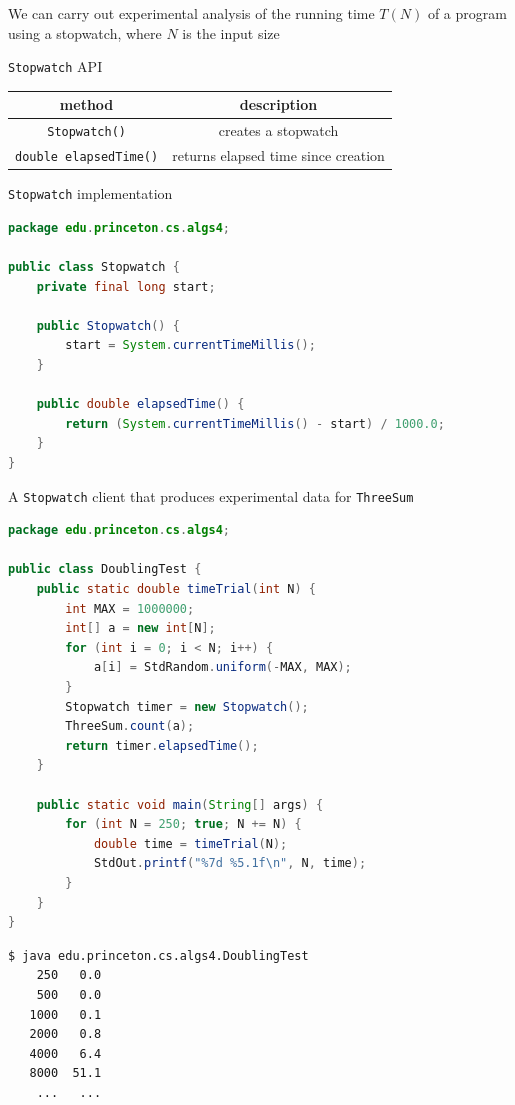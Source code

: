 \documentclass[8pt,a4paper,compress]{beamer}
\begin{document}
\begin{frame}[fragile]
We can carry out experimental analysis of the running time $T(N)$ of a program using a stopwatch, where $N$ is the input size

\bigskip

\lstinline{Stopwatch} API
\begin{center}
\begin{tabular}{cc}
method & description \\ \hline
\lstinline$Stopwatch()$ & creates a stopwatch \\
\lstinline$double elapsedTime()$ & returns elapsed time since creation
\end{tabular} 
\end{center}

\bigskip

\lstinline{Stopwatch} implementation
\begin{lstlisting}[language=Java]
package edu.princeton.cs.algs4;

public class Stopwatch {
    private final long start;
    
    public Stopwatch() { 
        start = System.currentTimeMillis(); 
    }
    
    public double elapsedTime() {
        return (System.currentTimeMillis() - start) / 1000.0;
    }
}
\end{lstlisting}
\end{frame}

\begin{frame}[fragile]
A \lstinline{Stopwatch} client that produces experimental data for \lstinline{ThreeSum}
\begin{lstlisting}[language=Java]
package edu.princeton.cs.algs4;

public class DoublingTest {
    public static double timeTrial(int N) {
        int MAX = 1000000;
        int[] a = new int[N];
        for (int i = 0; i < N; i++) {
            a[i] = StdRandom.uniform(-MAX, MAX);
        }
        Stopwatch timer = new Stopwatch();
        ThreeSum.count(a);
        return timer.elapsedTime();
    }

    public static void main(String[] args) { 
        for (int N = 250; true; N += N) {
            double time = timeTrial(N);
            StdOut.printf("%7d %5.1f\n", N, time);
        } 
    } 
} 
\end{lstlisting}

\begin{lstlisting}[language={}]
$ java edu.princeton.cs.algs4.DoublingTest
    250   0.0
    500   0.0
   1000   0.1
   2000   0.8
   4000   6.4
   8000  51.1
    ...   ...
\end{lstlisting}
\end{frame}
\end{document}
